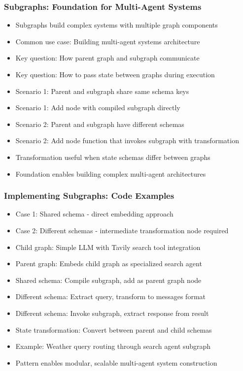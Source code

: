 \begin{frame}[fragile]\frametitle{Subgraphs: Foundation for Multi-Agent Systems}
      \begin{itemize}
          \item Subgraphs build complex systems with multiple graph components
          \item Common use case: Building multi-agent systems architecture
          \item Key question: How parent graph and subgraph communicate
          \item Key question: How to pass state between graphs during execution
          \item Scenario 1: Parent and subgraph share same schema keys
          \item Scenario 1: Add node with compiled subgraph directly
          \item Scenario 2: Parent and subgraph have different schemas
          \item Scenario 2: Add node function that invokes subgraph with transformation
          \item Transformation useful when state schemas differ between graphs
          \item Foundation enables building complex multi-agent architectures
      \end{itemize}
\end{frame}
\begin{frame}[fragile]\frametitle{Implementing Subgraphs: Code Examples}
      \begin{itemize}
          \item Case 1: Shared schema - direct embedding approach
          \item Case 2: Different schemas - intermediate transformation node required
          \item Child graph: Simple LLM with Tavily search tool integration
          \item Parent graph: Embeds child graph as specialized search agent
          \item Shared schema: Compile subgraph, add as parent graph node
          \item Different schema: Extract query, transform to messages format
          \item Different schema: Invoke subgraph, extract response from result
          \item State transformation: Convert between parent and child schemas
          \item Example: Weather query routing through search agent subgraph
          \item Pattern enables modular, scalable multi-agent system construction
      \end{itemize}
\end{frame}
